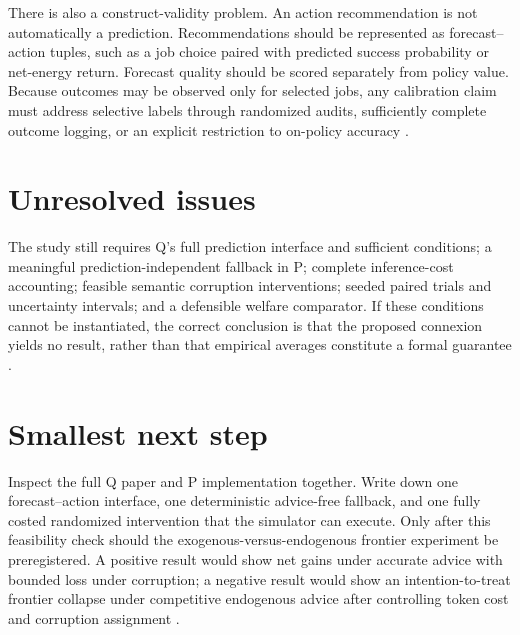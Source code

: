 \documentclass{article}
\begin{document}
There is also a construct-validity problem. An action recommendation is not automatically a prediction. Recommendations should be represented as forecast--action tuples, such as a job choice paired with predicted success probability or net-energy return. Forecast quality should be scored separately from policy value. Because outcomes may be observed only for selected jobs, any calibration claim must address selective labels through randomized audits, sufficiently complete outcome logging, or an explicit restriction to on-policy accuracy .

\section{Unresolved issues}

The study still requires Q's full prediction interface and sufficient conditions; a meaningful prediction-independent fallback in P; complete inference-cost accounting; feasible semantic corruption interventions; seeded paired trials and uncertainty intervals; and a defensible welfare comparator. If these conditions cannot be instantiated, the correct conclusion is that the proposed connexion yields no result, rather than that empirical averages constitute a formal guarantee .

\section{Smallest next step}

Inspect the full Q paper and P implementation together. Write down one forecast--action interface, one deterministic advice-free fallback, and one fully costed randomized intervention that the simulator can execute. Only after this feasibility check should the exogenous-versus-endogenous frontier experiment be preregistered. A positive result would show net gains under accurate advice with bounded loss under corruption; a negative result would show an intention-to-treat frontier collapse under competitive endogenous advice after controlling token cost and corruption assignment .
\end{document}
